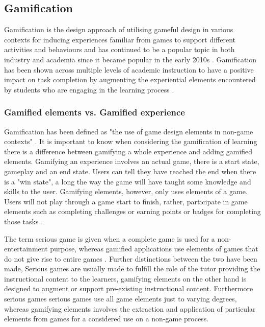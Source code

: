 \documentclass[12pt,a4paper]{article}
\begin{document}
\subsection{Gamification}
Gamification is the design approach of utilising gameful design in various contexts for inducing experiences familiar from games to support different activities and behaviours and has continued to be a popular topic in both industry and academia since it became popular in the early 2010s \cite{majuri2018gamification}. Gamification has been shown across multiple levels of academic instruction to have a positive impact on task completion by augmenting the experiential elements encountered by students who are engaging in the learning process \cite{kaufmann2018reflection}.



\subsubsection{Gamified elements vs. Gamified experience}
Gamification has been defined as "the use of game design elements in non-game contexts" \cite{deterding2011gamification}. It is important to know when considering the gamification of learning there is a difference between gamifying a whole experience and adding gamified elements. Gamifying an experience involves an actual game, there is a start state, gameplay and an end state. Users can tell they have reached the end when there is a "win state", a long the way the game will have taught some knowledge and skills to the user. Gamifying elements, however, only uses elements of a game. Users will not play through a game start to finish, rather, participate in game elements such as completing challenges or earning points or badges for completing those tasks \cite{kapp2012}.  


The term serious game is given when a complete game is used for a non-entertainment purpose, whereas gamified applications use elements of games that do not give rise to entire games \cite{deterding2011gamification}. Further distinctions between the two have been made, Serious games are usually made to fulfill the role of the tutor providing the instructional content to the learners, gamifying elements on the other hand is designed to augment or support pre-existing instructional content. Furthermore serious games serious games use all game elements just to varying degrees, whereas gamifying elements
involves the extraction and application of particular elements from games for a considered use on a non-game process\cite{landers2014developing}.  
\end{document}
